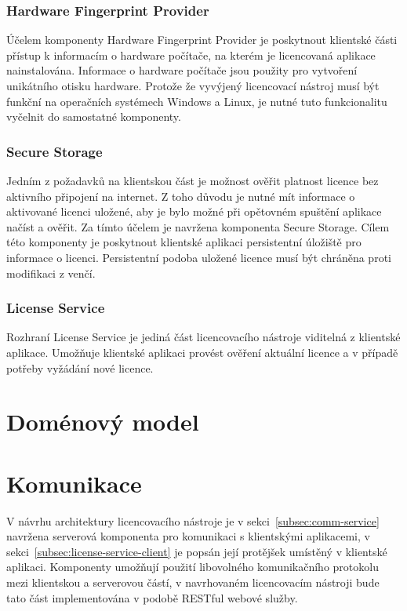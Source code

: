 \subsubsection*{Hardware Fingerprint Provider}

Účelem komponenty Hardware Fingerprint Provider je poskytnout klientské části
přístup k informacím o hardware počítače, na kterém je licencovaná aplikace
nainstalována. Informace o hardware počítače jsou použity pro vytvoření
unikátního otisku hardware. Protože že vyvýjený licencovací nástroj
musí být funkční na operačních systémech Windows a Linux, je nutné tuto
funkcionalitu vyčelnit do samostatné komponenty. 

\subsubsection*{Secure Storage}

Jedním z požadavků na klientskou část je možnost ověřit platnost licence bez
aktivního připojení na internet. Z toho důvodu je nutné mít informace o
aktivované licenci uložené, aby je bylo možné při opětovném spuštění aplikace
načíst a ověřit. Za tímto účelem je navržena komponenta Secure Storage. Cílem
této komponenty je poskytnout klientské aplikaci persistentní úložiště pro
informace o licenci. Persistentní podoba uložené licence musí být chráněna proti
modifikaci z venčí.

\subsubsection*{License Service}
 
Rozhraní License Service je jediná část licencovacího nástroje viditelná z
klientské aplikace. Umožňuje klientské aplikaci provést ověření aktuální licence
a v případě potřeby vyžádání nové licence.

\section{Doménový model}



\section{Komunikace}

V návrhu architektury licencovacího nástroje je v
sekci~\ref{subsec:comm-service} navržena serverová komponenta pro komunikaci s
klientskými aplikacemi, v sekci~\ref{subsec:license-service-client} je popsán
její protějšek umístěný v klientské aplikaci. Komponenty umožňují použití
libovolného komunikačního protokolu mezi klientskou a serverovou částí, v
navrhovaném licencovacím nástroji bude tato část implementována v podobě RESTful
webové služby.

